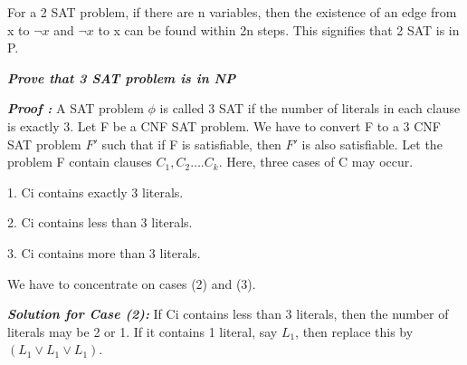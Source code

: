 \documentclass[10pt,a4paper]{book}
\begin{document}
For a 2 SAT problem, if there are n variables, then the existence of an edge from x to $\neg x$ and $\neg x$ to x can be found within 2n steps. This signifies that 2 SAT is in P.

\begin{flushleft}
\emph{\textsf{\textbf{Prove that 3 SAT problem is in NP}}}

\textsf{\textbf{\emph{Proof :}}} A SAT problem $\phi$ is called 3 SAT if the number of literals in each clause is exactly 3. Let F be a CNF SAT problem. We have to convert F to a 3 CNF SAT problem $F'$ such that if F is satisfiable, then $F'$ is also satisfiable. Let the problem F contain clauses $C_{1}, C_{2}….C_{k}$. Here, three cases of C may occur.

\footnotesize
1. Ci contains exactly 3 literals.

2. Ci contains less than 3 literals.

3. Ci contains more than 3 literals.

\: We have to concentrate on cases (2) and (3).

\textsl{\textbf{Solution for Case (2):}} If Ci contains less than 3 literals, then the number of literals may be 2 or 1. If it contains 1 literal, say $L_{1}$, then replace this by $(L_{1} \vee L_{1} \vee L_{1})$.
\end{flushleft}
\end{document}
